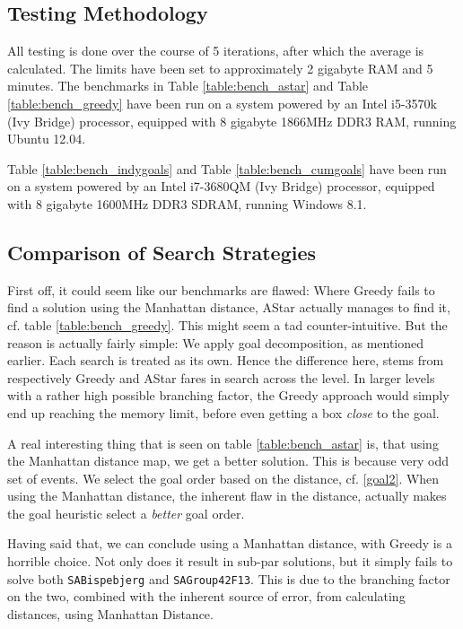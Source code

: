 \documentclass[letterpaper]{article}
\begin{document}
	\subsection{Testing Methodology}
		All testing is done over the course of 5 iterations, after which the average is calculated. The limits have been set to approximately 2 gigabyte RAM and 5 minutes. The benchmarks in Table \ref{table:bench_astar} and Table \ref{table:bench_greedy} have been run on a system powered by an Intel i5-3570k (Ivy Bridge) processor, equipped with 8 gigabyte 1866MHz DDR3 RAM, running Ubuntu 12.04.
		
		Table \ref{table:bench_indygoals} and Table \ref{table:bench_cumgoals} have been run on a system powered by an Intel i7-3680QM (Ivy Bridge) processor, equipped with 8 gigabyte 1600MHz DDR3 SDRAM, running Windows 8.1.

	\subsection{Comparison of Search Strategies}
		First off, it could seem like our benchmarks are flawed: Where Greedy fails to find a solution using the Manhattan distance, AStar actually manages to find it, cf. table \ref{table:bench_greedy}. This might seem a tad counter-intuitive. But the reason is actually fairly simple:  We apply goal decomposition, as mentioned earlier. Each search is treated as its own. Hence the difference here, stems from respectively Greedy and AStar fares in search across the level. In larger levels with a rather high possible branching factor, the Greedy approach would simply end up reaching the memory limit, before even getting a box \emph{close} to the goal.

		A real interesting thing that is seen on table \ref{table:bench_astar} is, that using the Manhattan distance map, we get a better solution. This is because very odd set of events. We select the goal order based on the distance, cf. \ref{goal2}. When using the Manhattan distance, the inherent flaw in the distance, actually makes the goal heuristic select a \emph{better} goal order.

		Having said that, we can conclude using a Manhattan distance, with Greedy is a horrible choice. Not only does it result in sub-par solutions, but it simply fails to solve both \verb=SABispebjerg= and \verb=SAGroup42F13=. This is due to the branching factor on the two, combined with the inherent source of error, from calculating distances, using Manhattan Distance. 
\end{document}
